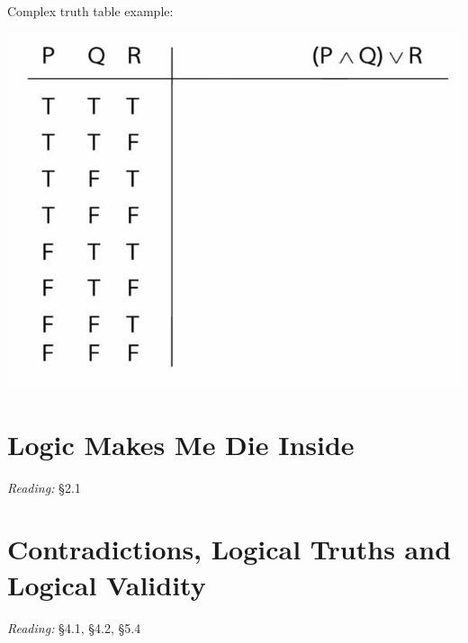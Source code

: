 \documentclass[12pt]{extarticle}
\begin{document}
\begin{multicols*}{3}
\begin{minipage}{\columnwidth}
Complex truth table example:
 
\begin{center}
\includegraphics[scale=0.3]{img/tt_p_and_q_or_r.png}
\end{center}
\end{minipage}
 
 
 
\section{Logic Makes Me Die Inside}
 
\emph{Reading:} §2.1
 
 
 
\section{Contradictions, Logical Truths and Logical Validity}
 
\emph{Reading:} §4.1, §4.2, §5.4
 

\end{multicols*}
\end{document}
